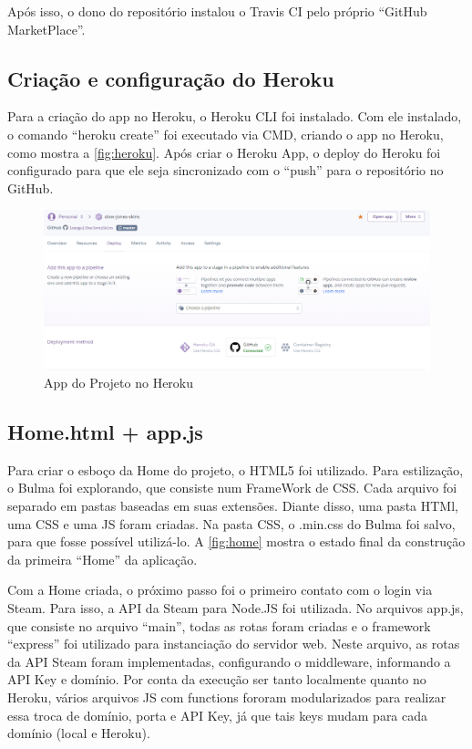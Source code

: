 Após isso, o dono do repositório instalou o Travis CI pelo próprio ``GitHub MarketPlace''.

\subsection{Criação e configuração do Heroku}
Para a criação do app no Heroku, o Heroku CLI foi instalado. Com ele instalado, o comando
``heroku create'' foi executado via CMD, criando o app no Heroku, como mostra a \autoref{fig:heroku}. Após criar o Heroku App, o deploy do Heroku foi configurado
para que ele seja sincronizado com o ``push'' para o repositório no GitHub.\\
\begin{figure}[!htb]
	\centering
	\includegraphics[scale=0.5]{Imagens/Heroku.png}
	\caption{App do Projeto no Heroku}
	\label{fig:heroku}
\end{figure}

\subsection{Home.html + app.js}
Para criar o esboço da Home do projeto, o HTML5 foi utilizado. Para estilização, o Bulma foi explorando,
que consiste num FrameWork de CSS. Cada arquivo foi separado em pastas baseadas em suas extensões. 
Diante disso, uma pasta HTMl, uma CSS e uma JS foram criadas. Na pasta CSS, o .min.css do Bulma foi salvo, para que fosse possível utilizá-lo. A \autoref{fig:home} mostra o estado final da construção da primeira ``Home'' da aplicação.

Com a Home criada, o próximo passo foi o primeiro contato com o login via Steam. Para isso, a API
da Steam para Node.JS foi utilizada. No arquivos app.js, que consiste no arquivo ``main'', todas as rotas foram criadas
e o framework ``express'' foi utilizado para instanciação do servidor web. Neste arquivo, as rotas da API Steam foram implementadas, configurando
o middleware, informando a API Key e domínio. Por conta da execução ser tanto localmente quanto no Heroku, 
vários arquivos JS com functions fororam modularizados para realizar essa troca de domínio, porta e API Key, já que tais keys mudam para cada domínio (local e Heroku). 

